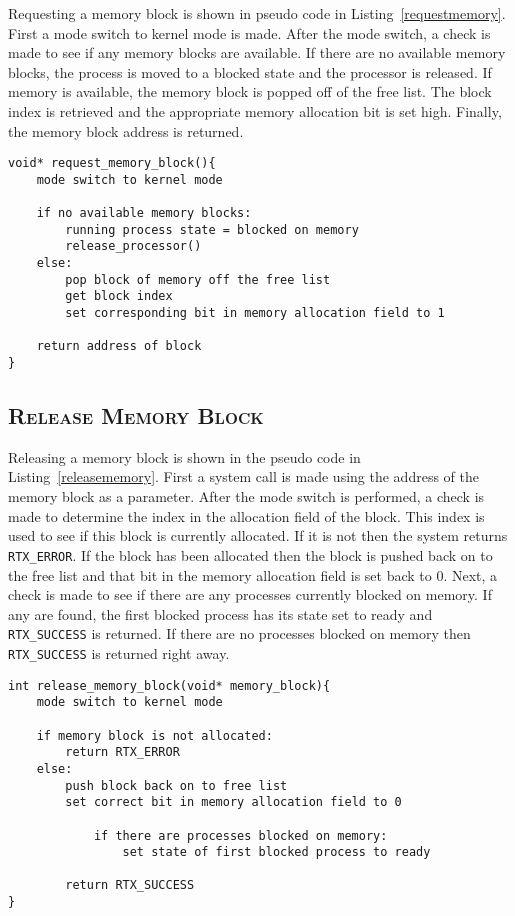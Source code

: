 \documentclass[oneside]{report}
\begin{document}
Requesting a memory block is shown in pseudo code in
Listing~\ref{requestmemory}. First a mode switch to kernel mode is made. After
the mode switch, a check is made to see if any memory blocks are available. If
there are no available memory blocks, the process is moved to a blocked state
and the processor is released. If memory is available, the memory block is
popped off of the free list. The block index is retrieved and the appropriate memory
allocation bit is set high. Finally, the memory block address is returned.

\begin{lstlisting}
void* request_memory_block(){
    mode switch to kernel mode

    if no available memory blocks:
        running process state = blocked on memory
        release_processor()
    else:
        pop block of memory off the free list        
        get block index
        set corresponding bit in memory allocation field to 1

    return address of block
}
\end{lstlisting}

\subsection{\textsc{Release Memory Block}}
Releasing a memory block is shown in the pseudo code in
Listing~\ref{releasememory}. First a system call is made using the address of
the memory block as a parameter.  After the mode switch is performed, a check
is made to determine the index in the allocation field of the block. This index
is used to see if this block is currently allocated. If it is not then the
system returns \texttt{RTX\_ERROR}. If the block has been allocated then the
block is pushed back on to the free list and that bit in the memory allocation
field is set back to 0. Next, a check is made to see if there are any processes
currently blocked on memory. If any are found, the first blocked process has
its state set to ready and \texttt{RTX\_SUCCESS} is returned. If there are no
processes blocked on memory then \texttt{RTX\_SUCCESS} is returned right away.

\begin{lstlisting}
int release_memory_block(void* memory_block){
    mode switch to kernel mode

    if memory block is not allocated:
        return RTX_ERROR
    else:
        push block back on to free list
        set correct bit in memory allocation field to 0

            if there are processes blocked on memory:
                set state of first blocked process to ready

        return RTX_SUCCESS        
}
\end{lstlisting}
\end{document}
